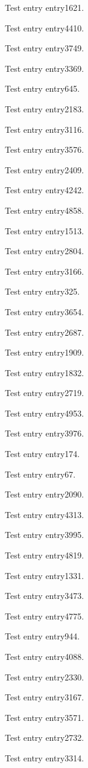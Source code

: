 Test entry \gls{entry1621}.

Test entry \gls{entry4410}.

Test entry \gls{entry3749}.

Test entry \gls{entry3369}.

Test entry \gls{entry645}.

Test entry \gls{entry2183}.

Test entry \gls{entry3116}.

Test entry \gls{entry3576}.

Test entry \gls{entry2409}.

Test entry \gls{entry4242}.

Test entry \gls{entry4858}.

Test entry \gls{entry1513}.

Test entry \gls{entry2804}.

Test entry \gls{entry3166}.

Test entry \gls{entry325}.

Test entry \gls{entry3654}.

Test entry \gls{entry2687}.

Test entry \gls{entry1909}.

Test entry \gls{entry1832}.

Test entry \gls{entry2719}.

Test entry \gls{entry4953}.

Test entry \gls{entry3976}.

Test entry \gls{entry174}.

Test entry \gls{entry67}.

Test entry \gls{entry2090}.

Test entry \gls{entry4313}.

Test entry \gls{entry3995}.

Test entry \gls{entry4819}.

Test entry \gls{entry1331}.

Test entry \gls{entry3473}.

Test entry \gls{entry4775}.

Test entry \gls{entry944}.

Test entry \gls{entry4088}.

Test entry \gls{entry2330}.

Test entry \gls{entry3167}.

Test entry \gls{entry3571}.

Test entry \gls{entry2732}.

Test entry \gls{entry3314}.

